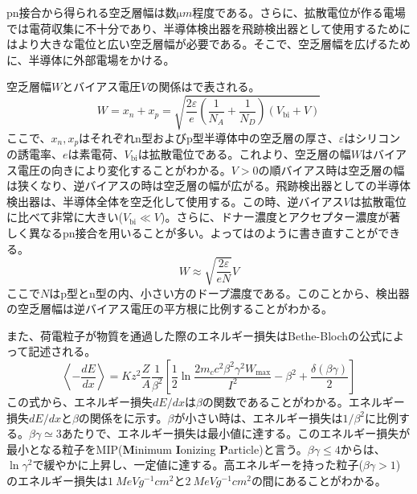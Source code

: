 pn接合から得られる空乏層幅は数$\si{\micro m}$程度である。さらに、拡散電位が作る電場では電荷収集に不十分であり、半導体検出器を飛跡検出器として使用するためにはより大きな電位と広い空乏層幅が必要である。そこで、空乏層幅を広げるために、半導体に外部電場をかける。

空乏層幅$W$とバイアス電圧$V$の関係はで表される。
\begin{equation}
  \label{eq:kuubousouhaba}
  W = x_n + x_p = \sqrt{\frac{2\varepsilon}{e}\left( \frac{1}{N_A} + \frac{1}{N_D} \right)(V_\mathrm{bi}+V) }
\end{equation}
ここで、$x_n, x_p$はそれぞれn型およびp型半導体中の空乏層の厚さ、$\varepsilon$はシリコンの誘電率、$e$は素電荷、$V_\mathrm{bi}$は拡散電位である。これより、空乏層の幅$W$はバイアス電圧の向きにより変化することがわかる。$V>0$の順バイアス時は空乏層の幅は狭くなり、逆バイアスの時は空乏層の幅が広がる。飛跡検出器としての半導体検出器は、半導体全体を空乏化して使用する。この時、逆バイアス$V$は拡散電位に比べて非常に大きい($V_\mathrm{bi}\ll V$)。さらに、ドナー濃度とアクセプター濃度が著しく異なるpn接合を用いることが多い。よってはのように書き直すことができる。
\begin{equation}
  \label{eq:kennshutukikuubousou}
  W \approx \sqrt{\frac{2\varepsilon }{eN}}V
\end{equation}
ここで$N$はp型とn型の内、小さい方のドープ濃度である。このことから、検出器の空乏層幅は逆バイアス電圧の平方根に比例することがわかる。

また、荷電粒子が物質を通過した際のエネルギー損失はBethe-Blochの公式によって記述される。
\begin{equation}
  \label{eq:bethe}
  \left\langle -\frac{dE}{dx} \right\rangle = Kz^2\frac{Z}{A}\frac{1}{\beta^2}\left[ \frac{1}{2}\ln\frac{2m_c c^2 \beta^2 \gamma^2 W_\mathrm{max}}{I^2} -\beta^2 + \frac{\delta (\beta\gamma)}{2} \right]
\end{equation}
この式から、エネルギー損失$dE/dx$は$\beta$の関数であることがわかる。エネルギー損失$dE/dx$と$\beta$の関係をに示す。$\beta$が小さい時は、エネルギー損失は$1/\beta^2$に比例する。$\beta\gamma \simeq 3$あたりで、エネルギー損失は最小値に達する。このエネルギー損失が最小となる粒子をMIP(\textbf{M}inimum \textbf{I}onizing \textbf{P}article)と言う。$\beta\gamma\leq4$からは、$\ln\gamma^2$で緩やかに上昇し、一定値に達する。高エネルギーを持った粒子($\beta\gamma>1$)のエネルギー損失は$1\ \si{MeVg^{-1}cm^2}$と$2\ \si{MeVg^{-1}cm^2}$の間にあることがわかる。

